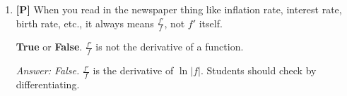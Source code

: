 \documentclass[12pt]{article}
\begin{document}
\begin{enumerate}
{\it Answer (c).} $e$ can be approximated very well by taking a number that is extremely close to 1, and raising it to a high enough power. Students may be puzzled by this answer, since $\displaystyle{\frac{2}{1}, \frac{3}{2}, \frac{4}{3},..., \frac{101}{100},...}$ gets very close to 1, and "1 to any power is 1". This may be a good time to point out that $1^{\infty}$ is not defined.
Note that (a) and (b) are also correct answers with the appropriate meanings, i.e., $e$ is not a number in the sense that it cannot be written down or completely computed numerically.

\bigskip

\item {\bf [P]} When you read in the newspaper thing like inflation rate, 
interest rate, birth rate, etc.,
it always means $\frac{f'}{f}$, not $f'$ itself.  

\textbf{True} or \textbf{False}. $\frac{f'}{f}$ is not the derivative of a function.

{\it Answer: False.} $\frac{f'}{f}$ is the derivative of $\ln|f|$. Students should check by differentiating.

\end{enumerate}

\pagebreak
\end{document}
